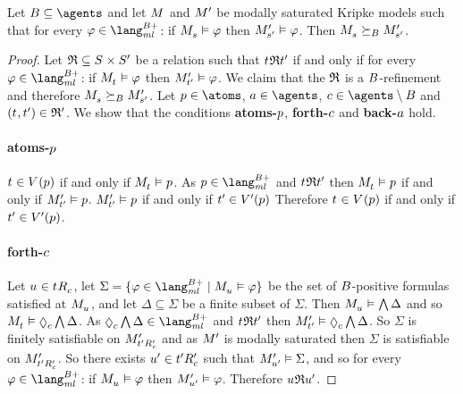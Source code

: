 \begin{proposition}
Let $\agentsB \subseteq \agents$ and let $\kModel$ and ${M^{\prime}_{}}$ be modally saturated Kripke models such that for every $\phi \in \langMlPlusBs$: if $\kPModel{\kStateS} \entails \phi$ then ${M^{\prime}_{{{s}^{\prime}}}} \vDash \varphi$.
Then $\kPModel{\kStateS} \simulatesBs \kPModelP{\kStateSP}$.
\end{proposition}

\begin{proof}
Let $\refinement \subseteq \kStates \times \kStatesP$ be a relation such that $\kStateT \refinement \kStateTP$ if and only if for every $\phi \in \langMlPlusBs$: if $\kPModel{\kStateT} \entails \phi$ then ${M^{\prime}_{{{t}^{\prime}}}} \vDash \varphi$.
We claim that the $\mathfrak{R}$ is a $B$-refinement and therefore $\kPModel{\kStateS} \simulatesBs \kPModelP{\kStateSP}$.
Let $\atomP \in \atoms$, $\agentA \in \agents$, $\agentC \in \agents \setminus \agentsB$ and $(\kStateT, \kStateTP) \in \refinement'$.
We show that the conditions {\bf atoms-$p$}, {\bf forth-$c$} and {\bf back-$a$} hold.

\paragraph{atoms-$p$}
$\kStateT \in \kValuation(\atomP)$ if and only if $\kPModel{\kStateT} \entails \atomP$.
As $\atomP \in \langMlPlusBs$ and $\kStateT \refinement \kStateTP$ then $\kPModel{\kStateT} \entails \atomP$ if and only if ${M^{\prime}_{{{t}^{\prime}}}} \vDash p$.
${M^{\prime}_{{{t}^{\prime}}}} \vDash p$ if and only if ${{t}^{\prime}} \in {V^{\prime}}(p)$
Therefore $\kStateT \in \kValuation(\atomP)$ if and only if ${{t}^{\prime}} \in {V^{\prime}}(p)$.

\paragraph{forth-$c$}
Let $\kStateU \in \kSuccessorsC{\kStateT}$, let $\Sigma = \{\phi \in \langMlPlusBs \mid \kPModel{\kStateU} \entails \phi\}$ be the set of $B$-positive formulas satisfied at $\kPModel{\kStateU}$, and let $\Delta \subseteq \Sigma$ be a finite subset of $\Sigma$.
Then $\kPModel{\kStateU} \entails \bigwedge \Delta$ and so $\kPModel{\kStateT} \entails \possibleC \bigwedge \Delta$.
As $\possibleC \bigwedge \Delta \in \langMlPlusBs$ and $\kStateT \refinement \kStateTP$ then $\kPModelP{\kStateTP} \entails \possibleC \bigwedge \Delta$.
So $\Sigma$ is finitely satisfiable on ${M^{\prime}_{{{{t}^{\prime}}} {R^{\prime}_{c}}}}$ and as ${M^{\prime}_{}}$ is modally saturated then $\Sigma$ is satisfiable on ${M^{\prime}_{{{{t}^{\prime}}} {R^{\prime}_{c}}}}$.
So there exists ${{u}^{\prime}} \in {{{t}^{\prime}}} {R^{\prime}_{c}}$ such that ${M^{\prime}_{{{u}^{\prime}}}} \vDash \Sigma$, and so for every $\phi \in \langMlPlusBs$: if $\kPModel{\kStateU} \entails \phi$ then ${M^{\prime}_{{{u}^{\prime}}}} \vDash \varphi$.
Therefore $\kStateU \refinement \kStateUP$.


\end{proof}
